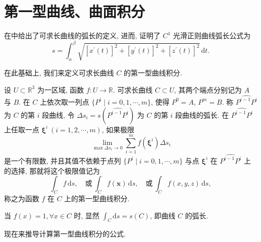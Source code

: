 \section{第一型曲线、曲面积分}

在中给出了可求长曲线的弧长的定义, 进而, 证明了 $C^{1}$ 光滑正则曲线弧长公式为
\[
  s=\int_{\alpha}^{\beta}\sqrt{\left[x^{\prime}(t)\right]^{2}+\left[y^{\prime}(t)\right]^{2}+\left[z^{\prime}(t)\right]^{2}}\,\mathrm{d} t.
\]

在此基础上, 我们来定义可求长曲线 $C$ 的第一型曲线积分.

\begin{definition}\label{def:11.1.1}
设 $U \subset \mathbb{R}^{3}$ 为一区域, 函数 $f: U \to \mathbb{R}$. 可求长曲线 $C \subset U$, 其两个端点分别记为 $A$ 与 $B$. 在 $C$ 上依次取一列点 $\{P^{i} \mid i=0,1,\cdots,m\}$, 使得 $P^{0}=A$, $P^{m}=B$. 称 $\widehat{P^{i-1} P^{i}}$ 为 $C$ 的第 $i$ 段曲线, 令 $\Delta s_{i}=s\left(\widehat{P^{i-1} P^{i}}\right)$ 为 $C$ 的第 $i$ 段曲线的弧长. 在 $\widehat{P^{i-1} P^{i}}$ 上任取一点 $\boldsymbol{\xi}^{i}\ (i=1,2,\cdots,m)$, 如果极限
\[
  \lim _{\max \Delta s_{i} \to 0} \sum_{i=1}^{m} f\left(\boldsymbol{\xi}^{i}\right) \Delta s_{i}
\]
是一个有限数, 并且其值不依赖于点列 $\{P^{i} \mid i=0,1,\cdots,m\}$ 与点 $\boldsymbol{\xi}^{i}$ 在 $\widehat{P^{i-1} P^{i}}$ 上的选择, 那就将这个极限值记为
\[
  \int_{C} f\,\mathrm{d} s, \quad \text{或}\ \int_{C} f(\boldsymbol{x})\,\mathrm{d} s, \quad \text{或}\ \int_{C} f(x, y, z)\,\mathrm{d} s,
\]
称之为函数 $f$ 在 $C$ 上的第一型曲线积分.
\end{definition}

当 $f(x)=1, \forall x \in C$ 时, 显然 $\int_{C} \mathrm{d} s=s(C)$, 即曲线 $C$ 的弧长.

现在来推导计算第一型曲线积分的公式.

